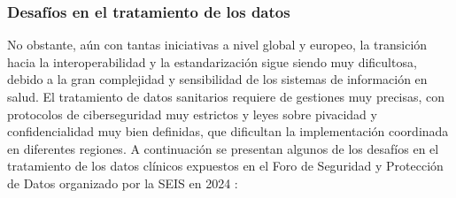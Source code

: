 \begin{enumerate}[label=\alph*.]
    

\end{enumerate}

\subsubsection{Desafíos en el tratamiento de los datos}

No obstante, aún con tantas iniciativas a nivel global y europeo, la transición hacia la interoperabilidad y la estandarización sigue siendo muy dificultosa, debido a la gran complejidad y sensibilidad de los sistemas de información en salud. El tratamiento de datos sanitarios requiere de gestiones muy precisas, con protocolos de ciberseguridad muy estrictos y leyes sobre pivacidad y confidencialidad muy bien definidas, que dificultan la implementación coordinada en diferentes regiones. A continuación se presentan algunos de los desafíos en el tratamiento de los datos clínicos expuestos en el Foro de Seguridad y Protección de Datos organizado por la SEIS en 2024 \cite{SEIS2024tercera} \cite{SEIS2024octava}:

